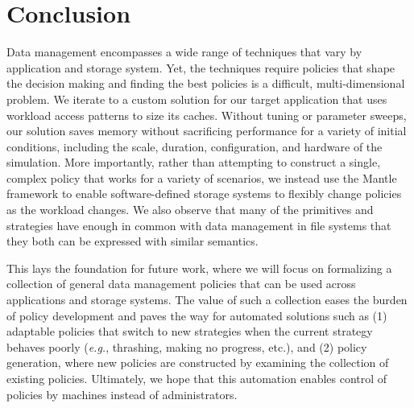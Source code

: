 \section{Conclusion}

Data management encompasses a wide range of techniques that vary by application
and storage system.  Yet, the techniques require policies that shape the
decision making and finding the best policies is a difficult, multi-dimensional
problem.  We iterate to a custom solution for our target application that uses
workload access patterns to size its caches. Without tuning or parameter
sweeps, our solution saves memory without sacrificing performance for a variety
of initial conditions, including the scale, duration, configuration, and
hardware of the simulation. More importantly, rather than attempting to
construct a single, complex policy that works for a variety of scenarios, we
instead use the Mantle framework to enable software-defined storage systems to
flexibly change policies as the workload changes.  We also observe that many of
the primitives and strategies have enough in common with data management in
file systems that they both can be expressed with similar semantics.

This lays the foundation for future work, where we will focus on formalizing a
collection of general data management policies that can be used across
applications and storage systems.  The value of such a collection eases the
burden of policy development and paves the way for automated solutions such as
(1) adaptable policies that switch to new strategies when the current strategy
behaves poorly ({\it e.g.}, thrashing, making no progress, etc.), and (2)
policy generation, where new policies are constructed by examining the
collection of existing policies.  Ultimately, we hope that this automation
enables control of policies by machines instead of administrators. 
